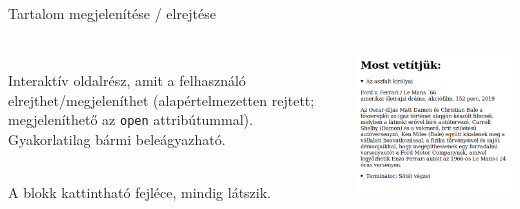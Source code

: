 \begin{frame}
  \begin{exampleblock}{}
    \footnotesize
    
  \end{exampleblock}
\end{frame}

\begin{frame}
  Tartalom megjelenítése / elrejtése
  \begin{columns}[T]
      \begin{description}[m]
        \item[\texttt{<details>}] \hfill \\ Interaktív oldalrész, amit a felhasználó elrejthet/megjeleníthet (alapértelmezetten rejtett; megjeleníthető az \texttt{open} attribútummal). Gyakorlatilag bármi beleágyazható.
        \item[\texttt{<summary>}] \hfill \\ A blokk kattintható fejléce, mindig látszik.
      \end{description}
      \begin{exampleblock}{}
        \includegraphics[width=\textwidth]{reszletek.png}
      \end{exampleblock}
  \end{columns}
\end{frame}

